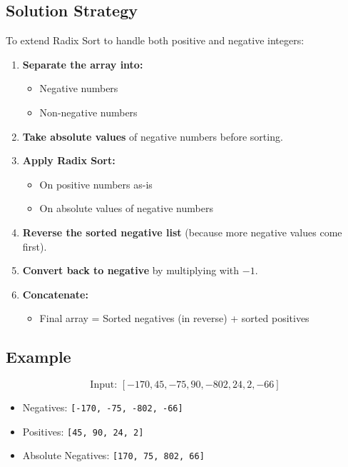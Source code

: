 \documentclass[14pt]{extarticle}
\begin{document}
\subsection*{Solution Strategy}

To extend Radix Sort to handle both positive and negative integers:

\begin{enumerate}[leftmargin=1.5em]
    \item \textbf{Separate the array into:}
    \begin{itemize}
        \item Negative numbers
        \item Non-negative numbers
    \end{itemize}
    
    \item \textbf{Take absolute values} of negative numbers before sorting.

    \item \textbf{Apply Radix Sort:}
    \begin{itemize}
        \item On positive numbers as-is
        \item On absolute values of negative numbers
    \end{itemize}
    
    \item \textbf{Reverse the sorted negative list} (because more negative values come first).

    \item \textbf{Convert back to negative} by multiplying with \(-1\).

    \item \textbf{Concatenate:}
    \begin{itemize}
        \item Final array = Sorted negatives (in reverse) + sorted positives
    \end{itemize}
\end{enumerate}

\subsection*{Example}

\[
\text{Input: } [-170, 45, -75, 90, -802, 24, 2, -66]
\]

\begin{itemize}
    \item Negatives: \texttt{[-170, -75, -802, -66]}
    \item Positives: \texttt{[45, 90, 24, 2]}
    \item Absolute Negatives: \texttt{[170, 75, 802, 66]}
\end{itemize}
\end{document}
